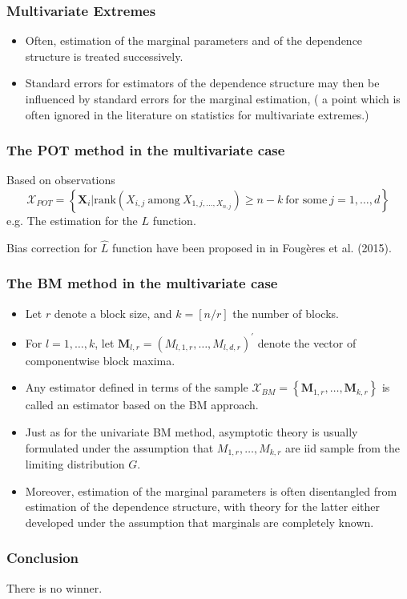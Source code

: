 \documentclass{beamer}
\newcommand{\bX}{\mathbf{X}}
\newcommand{\set}[1]{\left\{#1\right\}}
\begin{document}
\begin{frame}
    \frametitle{Multivariate Extremes}
\begin{itemize}
    \item  Often, estimation of the marginal parameters and of the dependence structure is
    treated successively.
    \item  Standard errors for estimators of the dependence
    structure may then be influenced by standard errors for the marginal estimation, ( a point which
    is often ignored in the literature on statistics for multivariate extremes.)
\end{itemize}


\end{frame}

\begin{frame}
    \frametitle{The POT method in the multivariate case}
Based on observations 
$$
\mathcal{X}_{POT}=\set{\bX_i| \text{rank}(X_{i,j} \ \text{among}\  X_{1,j,\dots,X_{n,j}})\ge n-k  \ \text{for some}\ j=1,\dots,d}
$$
e.g. The estimation for the $L$ function.

Bias correction for $\hat{L}$ function have been proposed in in Fougères et al. (2015).

\end{frame}

\begin{frame}
    \frametitle{The BM method in the multivariate case}
    \begin{itemize}
        \item    Let $r$ denote a block size, and $k = [n/r]$
        the number of blocks.
        \item For $l=1,\dots,k$, let $\mathbf{M}_{l,r}=(M_{l,1,r},\dots,M_{l,d,r})^{'}$ denote the vector of componentwise block maxima.
        \item  Any estimator defined in terms of the sample $\mathcal{X}_{BM}=\set{\mathbf{M}_{1,r},\dots,\mathbf{M}_{k,r}}$ is called an estimator based on the BM approach.
        \item Just as for the univariate BM method, asymptotic theory is usually formulated under the assumption that $M_{1,r},\dots,M_{k,r}$ are iid sample from the limiting distribution $G$.
        \item Moreover, estimation of the marginal parameters is often
        disentangled from estimation of the dependence structure, with theory for the latter either developed under the assumption that marginals are completely known.
    \end{itemize}
 
    
    
    
    

\end{frame}

\begin{frame}
    \frametitle{Conclusion}
    \begin{center}
        There is no winner.
    \end{center}

    

\end{frame}
\end{document}
